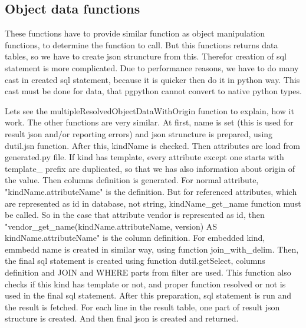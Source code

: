 \documentclass[deska]{subfiles}
\begin{document}
\subsection{Object data functions}
These functions have to provide similar function as object manipulation functions, to determine the function to call. But this functions returns data tables, so we have to create json struncture from this. Therefor creation of sql statement is more complicated. Due to performance reasons, we have to do many cast in created sql statement, because it is quicker then do it in python way. This cast must be done for data, that pgpython cannot convert to native python types.

Lets see the multipleResolvedObjectDataWithOrigin function to explain, how it work. The other functions are very similar.
At first, name is set (this is used for result json and/or reporting errors) and json struncture is prepared, using dutil.jsn function. After this, kindName is checked. Then attributes are load from generated.py file.
If kind has template, every attribute except one starts with template\_ prefix are duplicated, so that we has also information about origin of the value.
Then columns definition is generated. For normal attribute, "kindName.attributeName" is the definition. But for referenced attributes, which are
represented as id in database, not string, kindName\_get\_name function must be called. So in the case that attribute vendor is represented as id, then
"vendor\_get\_name(kindName.attributeName, version) AS kindName.attributeName" is the column definition. For embedded kind, emmbedd name is created in similar way,
using function join\_with\_delim.
Then, the final sql statement is created using function dutil.getSelect, columns definition and JOIN and WHERE parts from filter are used.
This function also checks if this kind has template or not, and proper function resolved or not is used in the final sql statement.
After this preparation, sql statement is run and the result is fetched. For each line in the result table, one part of result json structure is
created. And then final json is created and returned.
\end{document}
